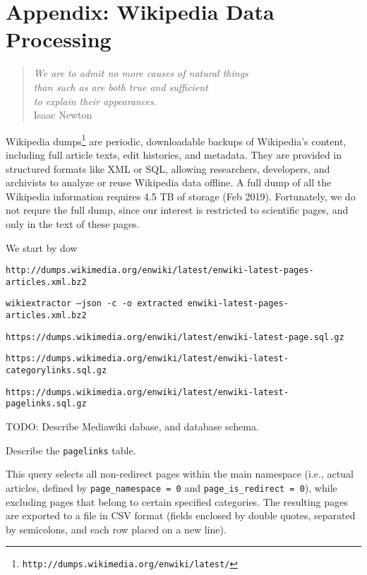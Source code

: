 %
%


\chapter{Appendix: Wikipedia Data Processing}
\label{apx:wikipedia}

\begin{quote}
\begin{flushright}
\emph{We are to admit no more causes of natural things \\
than such as are both true and sufficient \\
to explain their appearances.}\\
Isaac Newton
\end{flushright}
\end{quote}
\bigskip

Wikipedia dumps\footnote{\texttt{http://dumps.wikimedia.org/enwiki/latest/}} are periodic, downloadable backups of Wikipedia's content, including full article texts, edit histories, and metadata. They are provided in structured formats like XML or SQL, allowing researchers, developers, and archivists to analyze or reuse Wikipedia data offline. A full dump of all the Wikipedia information requires 4.5 TB of storage (Feb 2019). Fortunately, we do not requre the full dump, since our interest is restricted to scientific pages, and only in the text of these pages.

We start by dow

\texttt{http://dumps.wikimedia.org/enwiki/latest/enwiki-latest-pages-articles.xml.bz2}

\texttt{wikiextractor --json -c -o extracted enwiki-latest-pages-articles.xml.bz2}

\texttt{https://dumps.wikimedia.org/enwiki/latest/enwiki-latest-page.sql.gz}

\texttt{https://dumps.wikimedia.org/enwiki/latest/enwiki-latest-categorylinks.sql.gz}

\texttt{https://dumps.wikimedia.org/enwiki/latest/enwiki-latest-pagelinks.sql.gz}

{\color{red} TODO: Describe Mediawiki dabase, and database schema.}

{\color{red} Describe the \texttt{pagelinks} table.}

This query selects all non-redirect pages within the main namespace (i.e., actual articles, defined by \texttt{page\_namespace = 0} and \texttt{page\_is\_redirect = 0}), while excluding pages that belong to certain specified categories. The resulting pages are exported to a file in CSV format (fields enclosed by double quotes, separated by semicolons, and each row placed on a new line).

